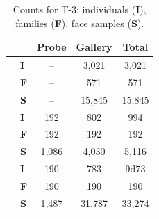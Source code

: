 \documentclass[letterpaper, 10 pt, conference]{ieeeconf}
\begin{document}
\begin{table}[b]
    \centering
    \caption{Counts for T-3: individuals (\textbf{I}), families (\textbf{F}), face samples (\textbf{S}).}
    \begin{tabular}{p{.1in}m{.1in}ccc}
    & &Probe &Gallery &Total\\\hline
     \parbox[t]{2mm}{
     }&\textbf{I} & --  & 3,021 & 3,021 \\
     &\textbf{F}  &-- & 571 & 571\\
     &\textbf{S} & --& 15,845 & 15,845 \\\hline
    
    \parbox[t]{2mm}{
    } &\textbf{I}  & 192 & 802  & 994  \\
     &\textbf{F} & 192 & 192 & 192  \\
     &\textbf{S}  &1,086  &4,030 &5,116 \\\hline
    


    \parbox[t]{2mm}{
    } &\textbf{I}& 190 & 783  & 9d73 \\
     &\textbf{F} &190  & 190  & 190   \\
     &\textbf{S}  &1,487  & 31,787 & 33,274\\\hline
    
    \end{tabular}\label{tbl:track3:counts} 
\end{table}
\end{document}

